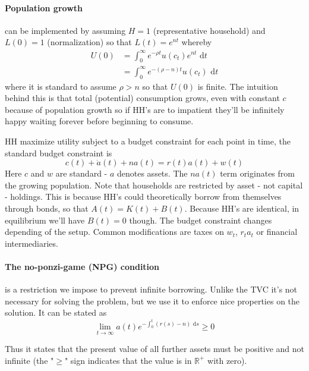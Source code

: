 \documentclass[12pt, a4paper]{article}
\begin{document}
\begin{spacing}{1.213}
\paragraph{Population growth} can be implemented by assuming $H=1$ (representative household) and $L(0)=1$ (normalization) so that $L(t) = e^{nt}$ whereby
\begin{align*}
U(0) &= \int_0^{\infty} e^{-\rho t} u(c_t) e^{nt} \textrm{ d}t \\
&= \int_0^{\infty} e^{-(\rho-n) t} u(c_t) \textrm{ d}t
\end{align*}
where it is standard to assume $\rho > n$ so that $U(0)$ is finite. The intuition behind this is that total (potential) consumption grows, even with constant $c$ because of population growth so if HH's are to impatient they'll be infinitely happy waiting forever before beginning to consume.

HH maximize utility subject to a budget constraint for each point in time, the standard budget constraint is 
\begin{equation}
c(t) + \dot{a}(t) + n a(t) = r(t)a(t) + w(t)
\end{equation}
Here $c$ and $w$ are standard - $a$ denotes assets. The $na(t)$ term originates from the growing population. Note that households are restricted by asset - not capital - holdings. This is because HH's could theoretically borrow from themselves through bonds, so that $A(t) = K(t) + B(t)$. Because HH's are identical, in equilibrium we'll have $B(t) = 0$ though. The budget constraint changes depending of the setup. Common modifications are taxes on $w_t$, $r_ta_t$ or financial intermediaries.

\paragraph{The no-ponzi-game (NPG) condition} is a restriction we impose to prevent infinite borrowing. Unlike the TVC it's not necessary for solving the problem, but we use it to enforce nice properties on the solution. It can be stated as 
\begin{equation}
\lim_{t \rightarrow \infty} a(t) e^{- \int_0^t (r(s)-n) \textrm{ d} s} \geq 0
\end{equation}

Thus it states that the present value of all further assets must be positive and not infinite (the "$\geq$" sign indicates that the value is in $\mathbb{R}^+$ with zero). 


\end{spacing}
\end{document}
